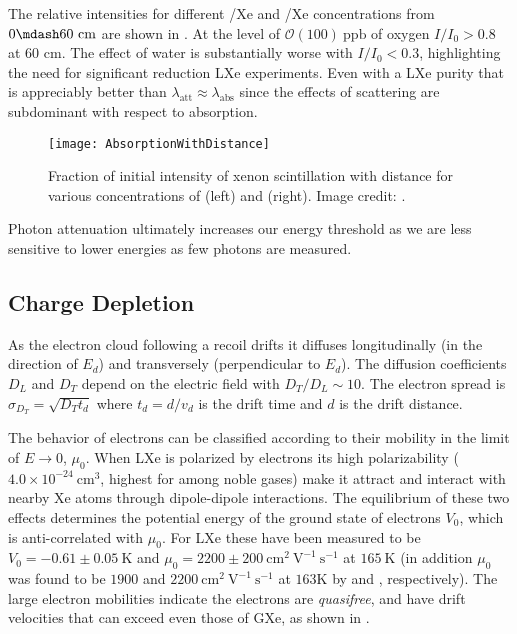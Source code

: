 The relative intensities for different /Xe and /Xe concentrations from $0 \mdash 60\ \mathrm{cm}$ are shown in
.  At the level of $\mathcal{O}(100)\ \mathrm{ppb}$ of
oxygen $I / I_0 > 0.8$ at 60 cm.  The effect of water is substantially worse with $I / I_0 < 0.3$, highlighting the need for
significant reduction LXe experiments.  Even with a LXe purity that is appreciably better than
 $\lambda_{\mathrm{att}} \approx \lambda_{\mathrm{abs}}$ since
the effects of scattering are subdominant with respect to absorption.

\begin{figure}
\centering
\texttt{[image: AbsorptionWithDistance]}
\caption{Fraction of initial intensity of xenon scintillation with distance for various concentrations of \htwoo (left) and \otwo
(right).  Image credit: .}
\label{fig:importance_procedure_effects_photons_absorption_distance}
\end{figure}

Photon attenuation ultimately increases our energy threshold as we are less sensitive to lower energies as few photons are
measured.



\subsection{Charge Depletion}
\label{subsubsec:importance_procedure_effects_charge}
As the electron cloud following a recoil drifts it diffuses
longitudinally (in the direction of $E_{d}$) and transversely (perpendicular to $E_{d}$).  The
diffusion coefficients $D_{L}$ and $D_{T}$ depend on the electric field with $D_{T}/D_{L} \sim 10$.  The electron spread is
$\sigma_{D_{T}} = \sqrt{D_{T} t_{d}}$ where $t_{d} = d/v_{d}$ is the drift time and $d$ is the drift distance.

The behavior of electrons can be classified according to their mobility in the limit of $E \rightarrow 0$, $\mu_0$.  When LXe is
polarized by electrons its high polarizability ($4.0 \times 10^{-24}\ \mathrm{cm^3}$, highest for among noble gases) make it
attract \electron and interact with nearby Xe atoms through dipole-dipole interactions.  The equilibrium of these two effects
determines the potential energy of the ground state of electrons $V_0$, which is anti-correlated with $\mu_0$.  For LXe these have
been measured to be $V_0 = -0.61 \pm 0.05\ \mathrm{K}$  and $\mu_0 = 2200 \pm 200\ \mathrm{cm^2\ V^{-1}\ s^{-1}}$
 at $165\ \mathrm{K}$ (in addition $\mu_0$ was found to be $1900$ and $2200\ \mathrm{cm^2\ V^{-1}\ s^{-1}}$
at $163\mathrm{K}$ by  and , respectively).  The large electron mobilities indicate the
electrons are \textit{quasifree}, and have drift velocities that can exceed even those of GXe, as shown in
.

